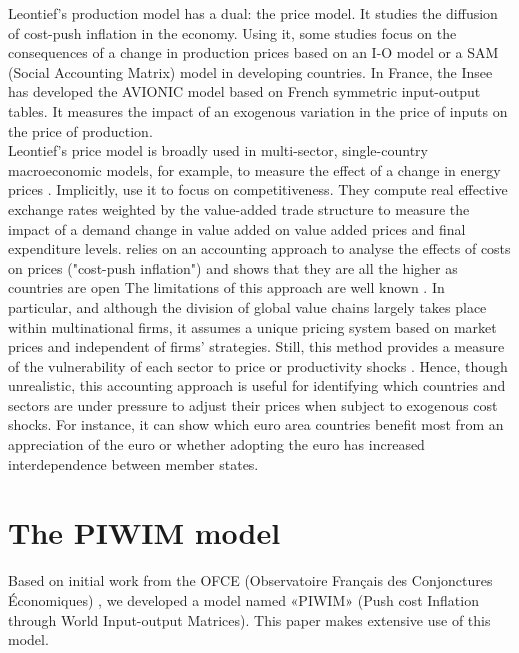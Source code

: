 \documentclass[11pt,a4paper]{article}
\begin{document}
Leontief's production model has a dual: the price model.
It studies the diffusion of cost-push inflation in the economy.
Using it, some studies focus on the consequences of a change in production prices based on an I-O model or a SAM (Social Accounting Matrix) model in developing countries. 
In France, the Insee \citep{Bourgeois2019} has developed the AVIONIC model based on French symmetric input-output tables. 
It measures the impact of an exogenous variation in the price of inputs on the price of production. \\
Leontief's price model is broadly used in multi-sector, single-country macroeconomic models, for example, to measure the effect of a change in energy prices \citep{Bournay2015, Sharify2013}. Implicitly, \cite{Bems2015} use it to focus on competitiveness. 
They compute real effective exchange rates weighted by the value-added trade structure to measure the impact of a demand change in value added on value added prices and final expenditure levels. %
\cite{Cochard2016} relies on an accounting approach to analyse the effects of costs on prices ("cost-push inflation") and shows that they are all the higher as countries are open
The limitations of this approach are well known \citep{Folloni1994}. In particular, and although the division of global value chains largely takes place within multinational firms, it assumes a unique pricing system based on market prices and independent of firms' strategies. Still, this method provides a measure of the vulnerability of each sector to price or productivity shocks \citep{Acemoglu2012,Carvalho2014}. 
Hence, though unrealistic, this accounting approach is useful for identifying which countries and sectors are under pressure to adjust their prices when subject to exogenous cost shocks. For instance, it can show which euro area countries benefit most from an appreciation of the euro or whether adopting the euro has increased interdependence between member states.


\section{The PIWIM model }
\label{sec:metho}
Based on initial work from the OFCE (Observatoire Français des Conjonctures Économiques) \cite{Cochard2016}, we developed a model named «PIWIM» (Push cost Inflation through World Input-output Matrices). This paper makes extensive use of this model.
\end{document}

